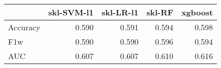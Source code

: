 \begin{tabular}{lrrrr}
\toprule
{} &  skl-SVM-l1 &  skl-LR-l1 &  skl-RF &  xgboost \\
\midrule
Accuracy &       0.590 &      0.591 &   0.594 &    0.598 \\
F1w      &       0.590 &      0.590 &   0.596 &    0.594 \\
AUC      &       0.607 &      0.607 &   0.610 &    0.616 \\
\bottomrule
\end{tabular}
